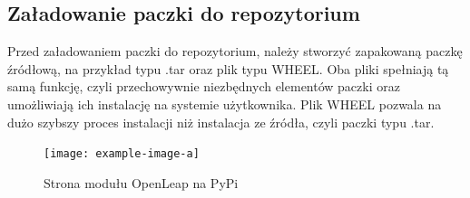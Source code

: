     \subsection{Załadowanie paczki do repozytorium}
    
    \quad Przed załadowaniem paczki do repozytorium, należy stworzyć zapakowaną paczkę źródłową, na przykład typu .tar oraz plik typu WHEEL. Oba pliki spełniają tą samą funkcję, czyli przechowywnie niezbędnych elementów paczki oraz umożliwiają ich instalację na systemie użytkownika. Plik WHEEL pozwala na dużo szybszy proces instalacji niż instalacja ze źródła, czyli paczki typu .tar. 

    \begin{figure}[H]
        \begin{center}
            \texttt{[image: example-image-a]}
            \caption{Strona modułu OpenLeap na PyPi}
        \end{center}
    \end{figure}
